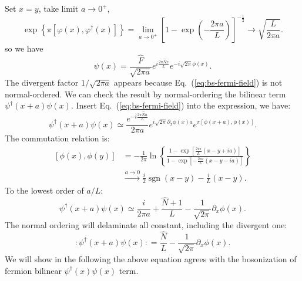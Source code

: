 Set $x=y$, take limit $a\rightarrow 0^+$,
\begin{equation*}
	\exp\left\{\pi[\varphi(x),\varphi^\dagger(x)] \right\} = \lim_{a\rightarrow0^+} \left[1-\exp\left(-\frac{2\pi a}{L}\right)\right]^{-\frac{1}{2}}
	\rightarrow \sqrt{\frac{L}{2\pi a}}.
\end{equation*}
so we have
\begin{equation}\label{eq:bs-fermi-field}
	\psi(x) = \frac{\hat{F}}{\sqrt{2\pi a}}e^{i\frac{2\pi\hat N x}{L}}e^{-i\sqrt{2\pi}\phi(x)}.
\end{equation}
The divergent factor $1/\sqrt{2\pi a}$ appears because Eq.~(\ref{eq:bs-fermi-field}) is not normal-ordered.
We can check the result by normal-ordering the bilinear term $\psi^\dagger(x+a)\psi(x)$.
Insert Eq.~(\ref{eq:bs-fermi-field}) into the expression, we have:
\begin{equation}
	\psi^\dagger(x+a)\psi(x)
	\simeq \frac{e^{-i\frac{2\pi\hat N a}{L}}}{2\pi a}
	e^{i\sqrt{2\pi}\partial_x\phi(x)  a} 
	e^{\pi[\phi(x+ a),\phi(x)]}.
\end{equation}
The commutation relation is:
\begin{equation}
\begin{aligned}
	\left[\phi(x),\phi(y)\right] 
	&= -\frac{1}{2\pi}\ln \left\{\frac{1-\exp \left[\frac{2 \pi i}{L}(x-y+i  a)\right]}{1-\exp \left[-\frac{2 \pi i}{L}(x-y-i  a)\right]}\right\} \\
	&\stackrel{ a \rightarrow 0}{\longrightarrow} 
		\frac{i}{2} \operatorname{sgn}(x-y)-\frac{i}{L}(x-y).
\end{aligned}
\end{equation}
To the lowest order of $a/L$: 
\begin{equation}
	\psi^\dagger(x+a)\psi(x) \simeq \frac{i}{2\pi a} + \frac{\hat N+1}{L} - \frac{1}{\sqrt{2\pi}}\partial_x\phi(x).
\end{equation}
The normal ordering will delaminate all constant, including the divergent one:
\begin{equation}
	{:\mathrel{\psi^\dagger(x+a)\psi(x)}:}
	= \frac{\hat N}{L} - \frac{1}{\sqrt{2\pi}}\partial_x\phi(x).
\end{equation}
We will show in the following the above equation agrees with the bosonization of fermion bilinear $\psi^\dagger(x)\psi(x)$ term.





